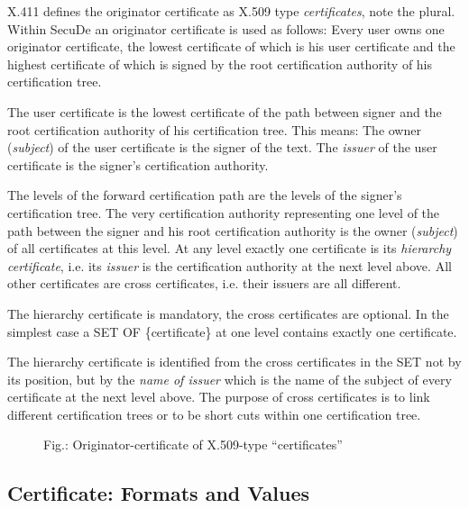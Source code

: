 X.411 defines the originator certificate as
X.509 type {\em certificates}, note the plural.
Within SecuDe an originator certificate
is used as follows:
Every user owns one originator certificate,
the lowest certificate of which is his user certificate and the
highest certificate of which is signed by the root certification
authority of his certification tree.

The user certificate is the lowest certificate of the path
between signer and the root certification authority of his
certification tree. This means:
The owner ({\em subject}) of the user certificate
is the signer of the text.
The {\em issuer} of
the user certificate
is the signer's certification authority.

The levels of the forward certification path are the levels of the
signer's certification tree.
The very certification authority representing one level of the path
between the signer and his root certification authority
is the owner ({\em subject}) of all certificates at this level.
At any level
exactly one certificate is its {\em hierarchy certificate},
i.e. its {\em issuer} is the certification authority at the next level above.
All other certificates are cross certificates, i.e. their issuers
are all different.

The hierarchy certificate is mandatory, the cross certificates are optional.
In the simplest case a SET OF \{certificate\} at one level contains
exactly one certificate.

The hierarchy certificate is identified from
the cross certificates in the SET not by its position, but
by the {\em name of issuer} which is the name of the subject
of every certificate at the next level above.
The purpose of cross certificates is to link different
certification trees or to be short cuts within one certification tree.
\newpage
\begin{figure}
\begin{center}
\end{center}
\label{fig-sc-oc}
{\footnotesize Fig.: Originator-certificate of X.509-type
``certificates''}
\end{figure}

\subsection{Certificate: Formats and Values}
\label{sc-cfv}


